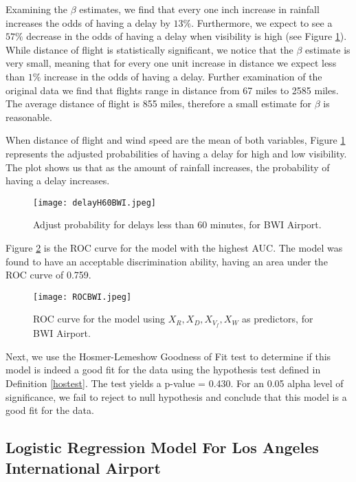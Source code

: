 \documentclass{asaproc}
\begin{document}
Examining the $\beta$ estimates, we find that every one inch increase in rainfall increases the odds of having a delay by $13\%$. Furthermore, we expect to see a $57\%$ decrease in the odds of having a delay when visibility is high (see Figure \ref{AdjuProL60BWI}). While distance of flight is statistically significant, we notice that the $\beta$ estimate is very small, meaning that for every one unit increase in distance we expect less than $1\%$ increase in the odds of having a delay. Further examination of the original data we find that flights range in distance from 67 miles to 2585 miles. The average distance of flight is 855 miles, therefore a small estimate for $\beta$ is reasonable.

When distance of flight and wind speed are the mean of both variables, Figure \ref{AdjuProL60BWI} represents the adjusted probabilities of having a delay for high and low visibility. The plot shows us that as the amount of rainfall increases, the probability of having a delay increases.
\begin{figure}[h]
    \centering
    \texttt{[image: delayH60BWI.jpeg]}
    \caption{Adjust probability for delays less than 60 minutes, for BWI Airport.}
    \label{AdjuProL60BWI}
\end{figure}

Figure \ref{bwi_roc} is the ROC curve for the model with the highest AUC. The model was found to have an acceptable discrimination ability, having an area under the ROC curve of 0.759.

\begin{figure}[h]
    \centering
    \texttt{[image: ROCBWI.jpeg]}
    \caption{ROC curve for the model using $X_R, X_D, X_{V_f}, X_W$ as predictors, for BWI Airport.}
    \label{bwi_roc}
\end{figure}

Next, we use the Hosmer-Lemeshow Goodness of Fit test \citep{hosmer1954applied} to determine if this model is indeed a good fit for the data using the hypothesis test defined in Definition \ref{hostest}. The test yields a p-value = 0.430. For an 0.05 alpha level of significance, we fail to reject to null hypothesis and conclude that this model is a good fit for the data.  

\subsection{Logistic Regression Model For Los Angeles International Airport}
\end{document}
